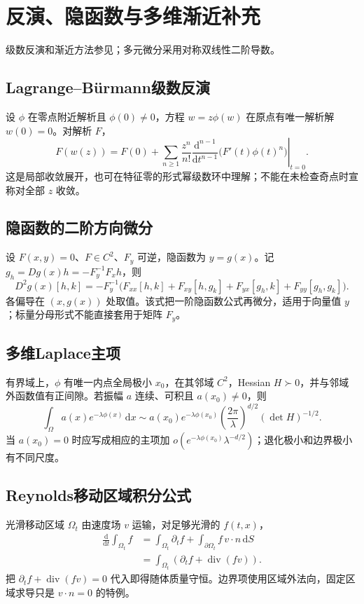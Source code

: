 \documentclass[../main.tex]{subfiles}
\begin{document}
\section{反演、隐函数与多维渐近补充}
级数反演和渐近方法参见\cite{dlmf}；多元微分采用对称双线性二阶导数。
\subsection{Lagrange--Bürmann级数反演}
设 $\phi$ 在零点附近解析且 $\phi(0)\ne0$，方程 $w=z\phi(w)$ 在原点有唯一解析解 $w(0)=0$。对解析 $F$，
\[
F(w(z))=F(0)+\sum_{n\ge1}\frac{z^n}{n!}
\left.\frac{\mathrm d^{n-1}}{\mathrm dt^{n-1}}
\bigl(F'(t)\phi(t)^n\bigr)\right|_{t=0}.
\]
这是局部收敛展开，也可在特征零的形式幂级数环中理解；不能在未检查奇点时宣称对全部 $z$ 收敛。
\subsection{隐函数的二阶方向微分}
设 $F(x,y)=0$、$F\in C^2$、$F_y$ 可逆，隐函数为 $y=g(x)$。记 $g_h=Dg(x)h=-F_y^{-1}F_xh$，则
\[
D^2g(x)[h,k]=-F_y^{-1}\bigl(F_{xx}[h,k]
+F_{xy}[h,g_k]+F_{yx}[g_h,k]+F_{yy}[g_h,g_k]\bigr).
\]
各偏导在 $(x,g(x))$ 处取值。该式把一阶隐函数公式再微分，适用于向量值 $y$；标量分母形式不能直接套用于矩阵 $F_y$。
\subsection{多维Laplace主项}
有界域上，$\phi$ 有唯一内点全局极小 $x_0$，在其邻域 $C^2$，Hessian $H\succ0$，并与邻域外函数值有正间隙。若振幅 $a$ 连续、可积且 $a(x_0)\ne0$，则
\[
\int_\Omega a(x)e^{-\lambda\phi(x)}\,\mathrm dx
\sim a(x_0)e^{-\lambda\phi(x_0)}
\left(\frac{2\pi}{\lambda}\right)^{d/2}(\det H)^{-1/2}.
\]
当 $a(x_0)=0$ 时应写成相应的主项加 $o(e^{-\lambda\phi(x_0)}\lambda^{-d/2})$；退化极小和边界极小有不同尺度。
\subsection{Reynolds移动区域积分公式}
光滑移动区域 $\Omega_t$ 由速度场 $v$ 运输，对足够光滑的 $f(t,x)$，
\begin{align*}
\frac{\mathrm d}{\mathrm dt}\int_{\Omega_t}f
&=\int_{\Omega_t}\partial_tf+\int_{\partial\Omega_t}f\,v\cdot n\,\mathrm dS\\
&=\int_{\Omega_t}(\partial_tf+\operatorname{div}(fv)).
\end{align*}
把 $\partial_tf+\operatorname{div}(fv)=0$ 代入即得随体质量守恒。边界项使用区域外法向，固定区域求导只是 $v\cdot n=0$ 的特例。
\clearpage
\end{document}
